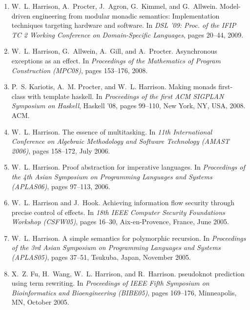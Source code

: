 \documentclass[12pt]{article} %
\begin{document}
\begin{enumerate}[leftmargin=0.0mm]
\item
W.~L. Harrison, A.~Procter, J.~Agron, G.~Kimmel, and G.~Allwein.
\newblock Model-driven engineering from modular monadic semantics:
  Implementation techniques targeting hardware and software.
\newblock In {\em DSL '09: Proc. of the IFIP TC 2 Working Conference on
  Domain-Specific Languages}, pages 20--44, 2009.



\item
W.~L. Harrison, G.~Allwein, A.~Gill, and A.~Procter.
\newblock Asynchronous exceptions as an effect.
\newblock In {\em Proceedings of the Mathematics of Program Construction
  (MPC08)}, pages 153--176, 2008.



\item
P.~S. Kariotis, A.~M. Procter, and W.~L. Harrison.
\newblock Making monads first-class with template haskell.
\newblock In {\em Proceedings of the first ACM SIGPLAN Symposium on Haskell},
  Haskell '08, pages 99--110, New York, NY, USA, 2008. ACM.

\item
W.~L. Harrison.
\newblock The essence of multitasking.
\newblock In {\em 11th International Conference on Algebraic Methodology and
  Software Technology {(AMAST 2006)}}, pages 158--172, July 2006.


\item
W.~L. Harrison.
\newblock Proof abstraction for imperative languages.
\newblock In {\em Proceedings of the 4th Asian Symposium on Programming
  Languages and Systems (APLAS06)}, pages 97--113, 2006.

\item
W.~L. Harrison and J.~Hook.
\newblock Achieving information flow security through precise control of
  effects.
\newblock In {\em 18th IEEE Computer Security Foundations Workshop (CSFW05)},
  pages 16--30, Aix-en-Provence, France, June 2005.

\item
W.~L. Harrison.
\newblock A simple semantics for polymorphic recursion.
\newblock In {\em Proceedings of the 3rd Asian Symposium on Programming
  Languages and Systems (APLAS05)}, pages 37--51, Tsukuba, Japan, November
  2005.

\item
X.~Z. Fu, H.~Wang, W.~L. Harrison, and R.~Harrison.
 pseudoknot prediction using term rewriting.
\newblock In {\em Proceedings of IEEE Fifth Symposium on Bioinformatics and
  Bioengineering (BIBE05)}, pages 169--176, Minneapolis, MN, October 2005.


\end{enumerate}
\end{document}
